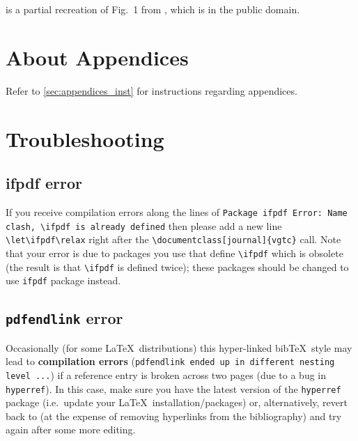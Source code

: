 \documentclass[journal]{vgtc}                     %
\begin{document}
 is a partial recreation of Fig.\ 1 from \cite{Isenberg:2017:VMC}, which is in the public domain.





%
%
%





\appendix %

\section{About Appendices}
Refer to \cref{sec:appendices_inst} for instructions regarding appendices.

\section{Troubleshooting}
\label{appendix:troubleshooting}

\subsection{ifpdf error}

If you receive compilation errors along the lines of \texttt{Package ifpdf Error: Name clash, \textbackslash ifpdf is already defined} then please add a new line \verb|\let\ifpdf\relax| right after the \verb|\documentclass[journal]{vgtc}| call.
Note that your error is due to packages you use that define \verb|\ifpdf| which is obsolete (the result is that \verb|\ifpdf| is defined twice); these packages should be changed to use \verb|ifpdf| package instead.


\subsection{\texttt{pdfendlink} error}

Occasionally (for some \LaTeX\ distributions) this hyper-linked bib\TeX\ style may lead to \textbf{compilation errors} (\texttt{pdfendlink ended up in different nesting level ...}) if a reference entry is broken across two pages (due to a bug in \verb|hyperref|).
In this case, make sure you have the latest version of the \verb|hyperref| package (i.e.\ update your \LaTeX\ installation/packages) or, alternatively, revert back to \verb|| (at the expense of removing hyperlinks from the bibliography) and try \verb|| again after some more editing.
\end{document}
